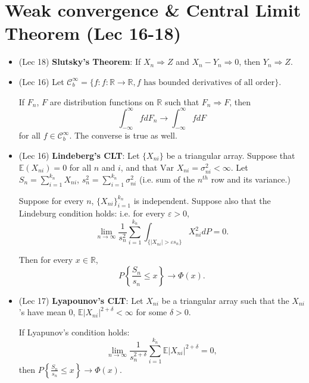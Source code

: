 \documentclass[twoside]{article}
\newcommand\bbE{\mathbb{E}}
\newcommand\bbR{\mathbb{R}}
\newcommand\dlt{\delta}
\def\eps{\varepsilon}
\newcommand\sg{\sigma}
\newcommand\var{\text{Var }}
\begin{document}
\section*{Weak convergence \& Central Limit Theorem (Lec 16-18)}
\begin{itemize}
\item (Lec 18) \textbf{Slutsky's Theorem}: If $X_n \Rightarrow Z$ and $X_n - Y_n \Rightarrow 0$, then $Y_n \Rightarrow Z$.

\item (Lec 16) Let $\mathcal{C}_b^\infty = \{ f: f: \bbR \rightarrow \bbR, f \text{ has bounded derivatives of all order} \}$.

If $F_n$, $F$ are distribution functions on $\bbR$ such that $F_n \Rightarrow F$, then
\begin{equation*} \int_{-\infty}^\infty f dF_n \rightarrow \int_{-\infty}^\infty f dF \end{equation*}
for all $f \in \mathcal{C}_b^\infty$. The converse is true as well.

\item (Lec 16) \textbf{Lindeberg's CLT}: Let $\{X_{ni}\}$ be a triangular array. Suppose that $\bbE(X_{ni}) = 0$ for all $n$ and $i$, and that $\var X_{ni} = \sg_{ni}^2 < \infty$. Let $S_n = \displaystyle\sum_{i=1}^{k_n} X_{ni}$, $s_n^2 = \displaystyle\sum_{i=1}^{k_n} \sg_{ni}^2 $ (i.e. sum of the $n^{th}$ row and its variance.)

Suppose for every $n$, $\{ X_{ni} \}_{i=1}^{k_n}$ is independent. Suppose also that the Lindeburg condition holds: i.e. for every $\eps > 0$,
\begin{equation*} \lim_{n \rightarrow \infty} \frac{1}{s_n^2} \sum_{i = 1}^{k_n} \int_{ \{ |X_{ni}| > \eps s_n \} } X_{ni}^2 dP = 0. \end{equation*}

Then for every $x \in \bbR$,
\begin{equation*} P\left\{ \frac{S_n}{s_n} \leq x \right\} \rightarrow \Phi(x). \end{equation*}

\item (Lec 17) \textbf{Lyapounov's CLT}: Let $X_{ni}$ be a triangular array such that the $X_{ni}$'s have mean 0, $\bbE |X_{ni}|^{2 + \dlt} < \infty$ for some $\dlt > 0$.

If Lyapunov's condition holds:
\begin{equation*} \lim_{n \rightarrow \infty} \frac{1}{s_n^{2+ \dlt}} \sum_{i = 1}^{k_n} \bbE |X_{ni}|^{2 + \dlt} = 0, \end{equation*}
then $P \left\{ \displaystyle\frac{S_n}{s_n} \leq x \right\}  \rightarrow \Phi(x)$.


\end{itemize}
\end{document}
